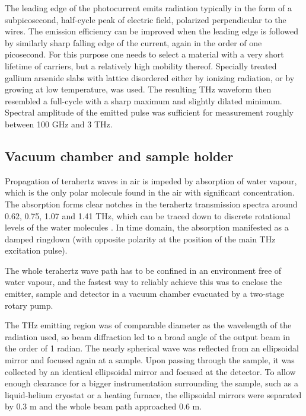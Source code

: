 The leading edge of the photocurrent emits radiation typically in the form of a subpicosecond, half-cycle peak of electric field, polarized perpendicular to the wires. 
The emission efficiency can be improved when the leading edge is followed by similarly sharp falling edge of the current, again in the order of one picosecond. For this purpose one needs to select a material with a very short lifetime of carriers, but a relatively high mobility thereof. Specially treated gallium arsenide slabs with lattice disordered either by ionizing radiation, or by growing at low temperature, was used. The resulting THz waveform then resembled a full-cycle with a sharp maximum and slightly dilated minimum. Spectral amplitude of the emitted pulse was sufficient for measurement roughly between 100 GHz and 3 THz.

\subsection{Vacuum chamber and sample holder}%
Propagation of terahertz waves in air is impeded by absorption of water vapour, which is the only polar molecule found in the air with significant concentration. The absorption forms clear notches in the terahertz transmission spectra around 0.62, 0.75, 1.07 and 1.41 THz, which can be traced down to discrete rotational levels of the water molecules \cite{exter1989}. In time domain, the absorption manifested as a damped ringdown (with opposite polarity at the position of the main THz excitation pulse). 

The whole terahertz wave path has to be confined in an environment free of water vapour, and the fastest way to reliably achieve this was to enclose the emitter, sample and detector in a vacuum chamber evacuated by a two-stage rotary pump. 

The THz emitting region was of comparable diameter as the wavelength of the radiation used, so beam diffraction led to a broad angle of the output beam in the order of 1 radian. The nearly spherical wave was reflected from an ellipsoidal %
 mirror and focused again at a sample. Upon passing through the sample, it was collected by an identical ellipsoidal mirror and focused at the detector. 
To allow enough clearance for a bigger instrumentation surrounding the sample, such as a liquid-helium cryostat or a heating furnace, the ellipsoidal mirrors were separated by 0.3 m and the whole beam path approached 0.6 m. %


